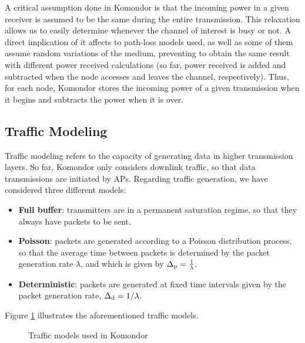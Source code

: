 \documentclass[a4paper]{article}
\begin{document}
		A critical assumption done in Komondor is that the incoming power in a given receiver is assumed to be the same during the entire transmission. This relaxation allows us to easily determine whenever the channel of interest is busy or not. A direct implication of it affects to path-loss models used, as well as some of them assume random variations of the medium, preventing to obtain the same result with different power received calculations (so far, power received is added and subtracted when the node accesses and leaves the channel, respectively). Thus, for each node, Komondor stores the incoming power of a given transmission when it begins and subtracts the power when it is over. 
	
	\subsection{Traffic Modeling}
	\label{section:traffic_modelling}
	Traffic modeling refers to the capacity of generating data in higher transmission layers. So far, Komondor only considers downlink traffic, so that data transmissions are initiated by APs. Regarding traffic generation, we have considered three different models:
	\begin{itemize}
		\item \textbf{Full buffer}: transmitters are in a permanent saturation regime, so that they always have packets to be sent.
		\item \textbf{Poisson}: packets are generated according to a Poisson distribution process, so that the average time between packets is determined by the packet generation rate $\lambda$, and which is given by $\Delta_{\rm p} = \frac{1}{\lambda}$.
		\item \textbf{Deterministic}: packets are generated at fixed time intervals given by the packet generation rate, $\Delta_{\rm d} = 1/\lambda$.
	\end{itemize}

	Figure \ref{fig:traffic_models} illustrates the aforementioned traffic models. 
	\begin{figure}[h!]
		\centering
		\caption{Traffic models used in Komondor}
		\label{fig:traffic_models}
	\end{figure}	
	
\end{document}
